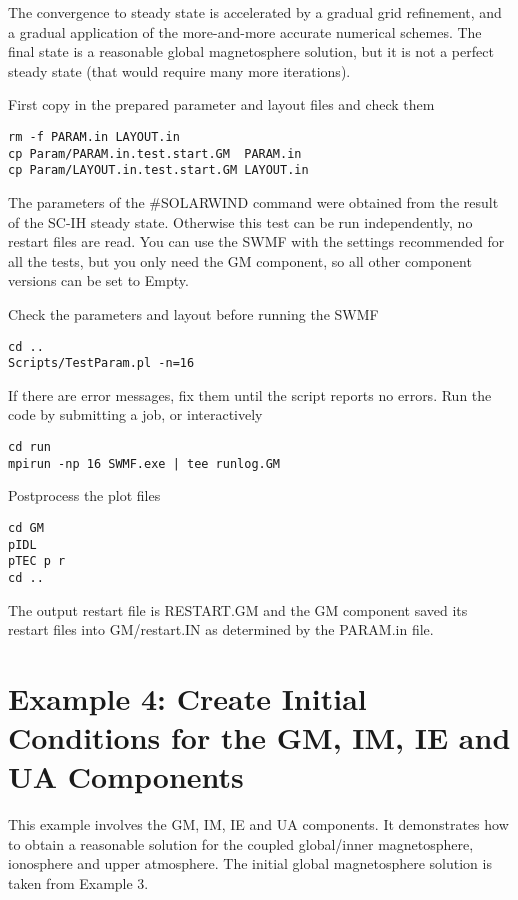The convergence to steady state is accelerated by 
a gradual grid refinement, and a gradual application of the
more-and-more accurate numerical schemes. The final state
is a reasonable global magnetosphere solution, but it is not 
a perfect steady state (that would require many more iterations).

First copy in the prepared parameter and layout files and check them
\begin{verbatim}
rm -f PARAM.in LAYOUT.in
cp Param/PARAM.in.test.start.GM  PARAM.in
cp Param/LAYOUT.in.test.start.GM LAYOUT.in
\end{verbatim}
The parameters of the \#SOLARWIND command were obtained
from the result of the SC-IH steady state. 
Otherwise this test can be run independently, 
no restart files are read.
You can use the SWMF with the settings recommended for all the tests, 
but you only need the GM component, so all other component versions 
can be set to Empty.

Check the parameters and layout before running the SWMF
\begin{verbatim}
cd ..
Scripts/TestParam.pl -n=16
\end{verbatim}
If there are error messages, fix them until the script reports no errors.
Run the code by submitting a job, or interactively
\begin{verbatim}
cd run
mpirun -np 16 SWMF.exe | tee runlog.GM
\end{verbatim}
Postprocess the plot files
\begin{verbatim}
cd GM
pIDL
pTEC p r
cd ..
\end{verbatim}
The output restart file is RESTART.GM and the GM component saved
its restart files into GM/restart.IN as determined by the PARAM.in file.

\section{Example 4: Create Initial Conditions for the GM, IM, IE 
         and UA Components}

This example involves the GM, IM, IE and UA components. It demonstrates
how to obtain a reasonable solution for the 
coupled global/inner magnetosphere, ionosphere and upper atmosphere.
The initial global magnetosphere solution is taken from Example 3.

